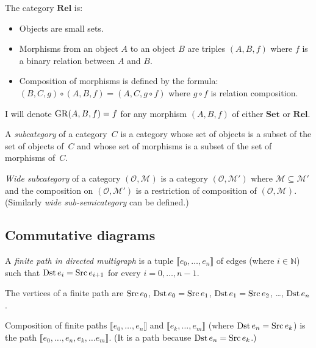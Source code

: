 \begin{defn}
The category $\mathbf{Rel}$ is:
\begin{itemize}
\item Objects are small sets.
\item Morphisms from an object $A$ to an object $B$ are triples $(A,B,f)$
where $f$ is a binary relation between $A$ and $B$.
\item Composition of morphisms is defined by the formula: $(B,C,g)\circ(A,B,f)=(A,C,g\circ f)$
where $g\circ f$ is relation composition.
\end{itemize}
\end{defn}
I will denote $\operatorname{GR}(A,B,f)=f$ for any morphism $(A,B,f)$ of either
$\mathbf{Set}$ or $\mathbf{Rel}$.


\begin{defn}
A \emph{subcategory} of a category~$C$ is a category whose set of
objects is a subset of the set of objects of~$C$ and whose set of
morphisms is a subset of the set of morphisms of~$C$.
\end{defn}

\begin{defn}
\emph{Wide subcategory} of a category $(\mathcal{O},\mathcal{M})$
is a category $(\mathcal{O},\mathcal{M}')$ where $\mathcal{M}\subseteq\mathcal{M}'$
and the composition on $(\mathcal{O},\mathcal{M}')$ is a restriction
of composition of $(\mathcal{O},\mathcal{M})$. (Similarly \emph{wide
sub-semicategory} can be defined.)
\end{defn}

\subsection{Commutative diagrams}
\begin{defn}
A \emph{finite path in directed multigraph} is a tuple $\llbracket e_{0},\ldots,e_{n}\rrbracket$
of edges (where $i\in\mathbb{N}$) such that $\operatorname{Dst} e_{i}=\operatorname{Src} e_{i+1}$
for every $i=0,\dots,n-1$.
\end{defn}

\begin{defn}
The vertices of a finite path are $\operatorname{Src} e_{0}$, $\operatorname{Dst} e_{0}=\operatorname{Src} e_{1}$,
$\operatorname{Dst} e_{1}=\operatorname{Src} e_{2}$, \ldots{}, $\operatorname{Dst} e_{n}$.
\end{defn}

\begin{defn}
Composition of finite paths $\llbracket e_{0},\ldots,e_{n}\rrbracket$
and $\llbracket e_{k},\ldots,e_{m}\rrbracket$ (where $\operatorname{Dst} e_{n}=\operatorname{Src} e_{k}$)
is the path $\llbracket e_{0},\ldots,e_{n},e_{k},\dots e_{m}\rrbracket$.
(It is a path because $\operatorname{Dst} e_{n}=\operatorname{Src} e_{k}$.)
\end{defn}

